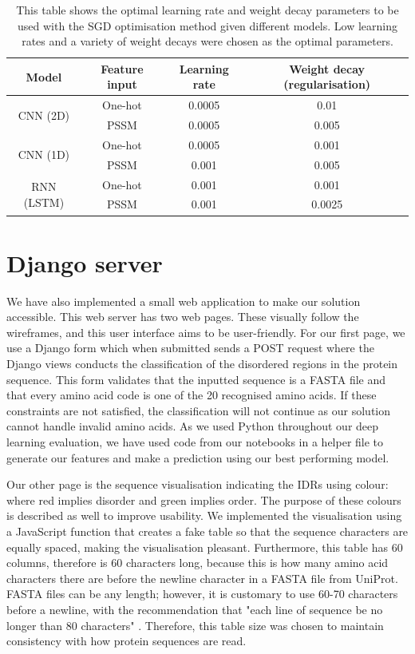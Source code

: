 \documentclass{l4proj}
\begin{document}
\begin{table}[!ht]
    \centering
    \caption{This table shows the optimal learning rate and weight decay parameters to be used with the SGD optimisation method given different models. Low learning rates and a variety of weight decays were chosen as the optimal parameters.}
    
    \begin{tabular}{@{}cccc@{}}
    \toprule
    Model & Feature input & Learning rate & Weight decay (regularisation) \\ \midrule
    \multirow{2}{*}{CNN (2D)} & One-hot & 0.0005 & 0.01 \\
     & PSSM & 0.0005 & 0.005 \\
    \multirow{2}{*}{CNN (1D)} & One-hot & 0.0005 & 0.001 \\
     & PSSM & 0.001 & 0.005 \\
    \multirow{2}{*}{RNN (LSTM)} & One-hot & 0.001 & 0.001 \\
     & PSSM & 0.001 & 0.0025 \\ \cmidrule(l){1-4} 
    \end{tabular}

    \label{tab:hyperparameters} 
\end{table}

\section{Django server}
We have also implemented a small web application to make our solution accessible. This web server has two web pages. These visually follow the wireframes, and this user interface aims to be user-friendly. For our first page, we use a Django form which when submitted sends a POST request where the Django views conducts the classification of the disordered regions in the protein sequence. This form validates that the inputted sequence is a FASTA file and that every amino acid code is one of the 20 recognised amino acids. If these constraints are not satisfied, the classification will not continue as our solution cannot handle invalid amino acids. As we used Python throughout our deep learning evaluation, we have used code from our notebooks in a helper file to generate our features and make a prediction using our best performing model.

Our other page is the sequence visualisation indicating the IDRs using colour: where red implies disorder and green implies order. The purpose of these colours is described as well to improve usability. We implemented the visualisation using a JavaScript function that creates a fake table so that the sequence characters are equally spaced, making the visualisation pleasant. Furthermore, this table has 60 columns, therefore is 60 characters long, because this is how many amino acid characters there are before the newline character in a FASTA file from UniProt. FASTA files can be any length; however, it is customary to use 60-70 characters before a newline, with the recommendation that "each line of sequence be no longer than 80 characters" \citep{NCBI:88}. Therefore, this table size was chosen to maintain consistency with how protein sequences are read.
\end{document}

